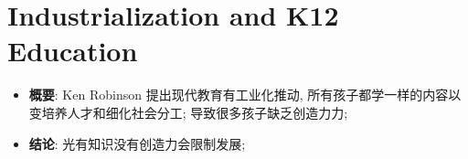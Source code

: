 \section{Industrialization and K12 Education}

  \begin{itemize}
    \item \textbf{概要}: Ken Robinson 提出现代教育有工业化推动,
    所有孩子都学一样的内容以变培养人才和细化社会分工; 导致很多孩子缺乏创造力力;
    \item \textbf{结论}: 光有知识没有创造力会限制发展;
  \end{itemize}
